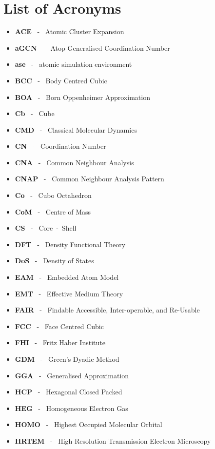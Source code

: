 \chapter*{List of Acronyms}

\begin{itemize}
\item[]\textbf{ACE} ~-~ Atomic Cluster Expansion
\item[]\textbf{aGCN} ~-~ Atop Generalised Coordination Number
\item[]\textbf{ase} ~-~ atomic simulation environment
\item[]\textbf{BCC} ~-~ Body Centred Cubic
\item[]\textbf{BOA} ~-~ Born Oppenheimer Approximation
\item[]\textbf{Cb} ~-~ Cube
\item[]\textbf{CMD} ~-~ Classical Molecular Dynamics
\item[]\textbf{CN} ~-~ Coordination Number
\item[]\textbf{CNA} ~-~ Common Neighbour Analysis
\item[]\textbf{CNAP} ~-~ Common Neighbour Analysis Pattern
\item[]\textbf{Co} ~-~ Cubo Octahedron
\item[]\textbf{CoM} ~-~ Centre of Mass
\item[] \textbf{CS} ~-~ Core~-~Shell
\item[]\textbf{DFT} ~-~ Density Functional Theory
\item[]\textbf{DoS} ~-~ Density of States
\item[]\textbf{EAM} ~-~ Embedded Atom Model
\item[]\textbf{EMT} ~-~ Effective Medium Theory
\item[]\textbf{FAIR} ~-~ Findable Accessible, Inter-operable, and Re-Usable
\item[]\textbf{FCC} ~-~ Face Centred Cubic
\item[]\textbf{FHI} ~-~ Fritz Haber Institute
\item[]\textbf{GDM} ~-~ Green's Dyadic Method
\item[]\textbf{GGA} ~-~ Generalised Approximation
\item[]\textbf{HCP} ~-~ Hexagonal Closed Packed
\item[]\textbf{HEG} ~-~ Homogeneous Electron Gas
\item[]\textbf{HOMO} ~-~ Highest Occupied Molecular Orbital
\item[]\textbf{HRTEM} ~-~ High Resolution Transmission Electron Microscopy

\end{itemize}
